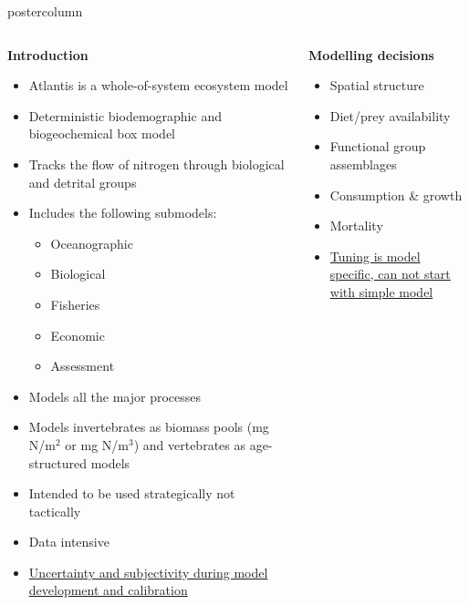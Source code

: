 \documentclass[final,hyperref={pdfpagelabels=false}]{beamer}
\begin{document}
\begin{frame}
\begin{columns}
\begin{column}{1\textwidth}
\begin{beamercolorbox}[center,wd=\textwidth]{postercolumn}
\begin{minipage}[T]{.98\textwidth}
{\begin{block}{}
\begin{columns}
\begin{column}{.49\textwidth}
              \centering \textbf{Introduction}
              \begin{itemize}
              \item Atlantis is a whole-of-system ecosystem model
              \item Deterministic biodemographic and biogeochemical box model
              \item Tracks the flow of nitrogen through biological and detrital groups
              \item Includes the following submodels:
                \begin{itemize}
                \item Oceanographic
                \item Biological
                \item Fisheries
                \item Economic
                \item Assessment
                \end{itemize}
              \item Models all the major processes
              \item Models invertebrates as biomass pools (mg N/m$^2$ or mg N/m$^3$) and vertebrates as age-structured models
              \item Intended to be used strategically not tactically
              \item Data intensive
              \item \underline{Uncertainty and subjectivity during model development and calibration}
              \end{itemize}
              \end{column}
               \begin{column}{.49\textwidth}
              \centering \textbf{Modelling decisions}
              \begin{itemize}
              \item Spatial structure
              \item Diet/prey availability
              \item Functional group assemblages
              \item Consumption \& growth
              \item Mortality
              \item \underline{Tuning is model specific, can not start with simple model}
               \end{itemize}
               

\end{column}
\end{columns}
\end{block}}
\end{minipage}
\end{beamercolorbox}
\end{column}
\end{columns}
\end{frame}
\end{document}
